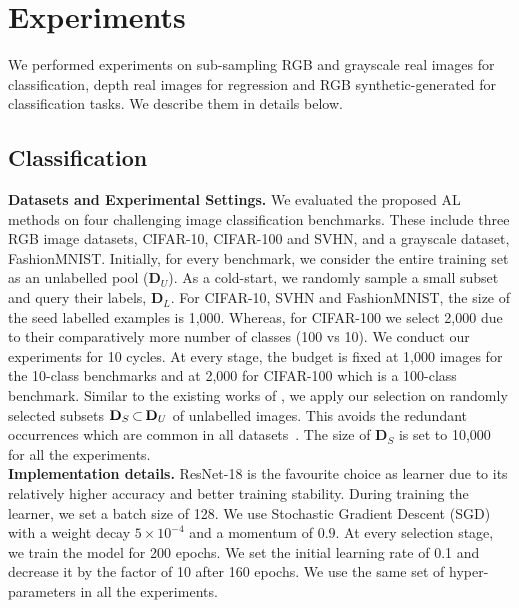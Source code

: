 \section{Experiments}
\label{experiments}
We performed experiments on sub-sampling RGB and grayscale real images for classification,
depth real images for regression and RGB synthetic-generated for classification tasks. We describe them in details below.
\subsection{Classification}
\noindent \textbf{Datasets and Experimental Settings.} 
We evaluated the proposed AL methods on four challenging image classification 
benchmarks. These include three RGB image datasets, CIFAR-10\cite{cifar}, CIFAR-100\cite{cifar} and SVHN\cite{Goodfellow2014Multi-digitNetworks},
and a grayscale dataset, FashionMNIST\cite{Xiao2017Fashion-MNIST:Algorithms}.
Initially, for every benchmark, we consider the entire training set as an unlabelled pool ($\mathbf{D}_U$). As a cold-start, we randomly sample a small subset and query their labels, $\mathbf{D}_L$. 
For CIFAR-10, SVHN and FashionMNIST, the size of the seed labelled examples is 1,000. Whereas, for CIFAR-100 we select 2,000
due to their comparatively more number of classes (100 vs 10). 
We conduct our experiments for 10 cycles. At every stage, the budget is fixed at
1,000 images for the 10-class benchmarks and at 2,000
for CIFAR-100 which is a 100-class benchmark. 
Similar to the existing works of \cite{BeluchBcai2018TheClassification,Yoo2019LearningLearning},
we apply our selection on randomly selected subsets $\mathbf{D}_S \hspace{-1pt}\subset\hspace{-1pt} \mathbf{D}_U$ 
of unlabelled images. This avoids the redundant occurrences which are common in all datasets~\cite{data_redundant}. The size of $\mathbf{D}_S$ is set to 10,000 for all the experiments.
\\
\noindent \textbf{Implementation details.} 
ResNet-18 \cite{he2016deep}  is the favourite choice as learner due to its relatively  
higher accuracy and better training stability.
During training the learner, we set a batch size of 128. We use Stochastic Gradient Descent (SGD) 
with a weight decay $5 \times 10^{-4}$ and a momentum of $0.9$. At every selection stage, we train the model for
200 epochs. We set the initial learning rate of 0.1 and decrease it by the factor of 10 after 160 epochs. 
We use the same set of hyper-parameters in all the experiments. 

